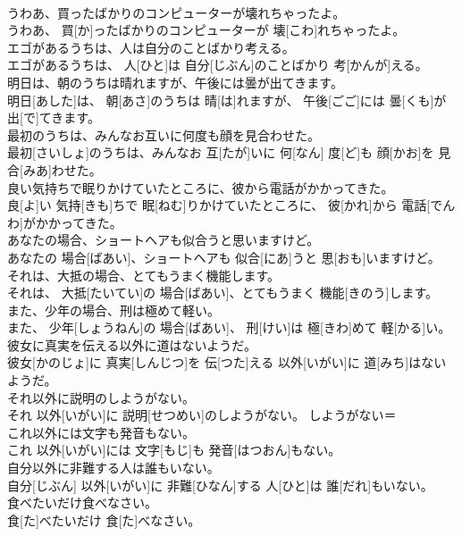 \documentclass[8pt]{extreport}
\begin{document}
\begin{CJK}{UTF8}{min}
\\	うわあ、買ったばかりのコンピューターが壊れちゃったよ。	
\\	うわあ、 買[か]ったばかりのコンピューターが 壊[こわ]れちゃったよ。	
\\	エゴがあるうちは、人は自分のことばかり考える。	
\\	エゴがあるうちは、 人[ひと]は 自分[じぶん]のことばかり 考[かんが]える。	
\\	明日は、朝のうちは晴れますが、午後には曇が出てきます。	
\\	明日[あした]は、 朝[あさ]のうちは 晴[は]れますが、 午後[ごご]には 曇[くも]が 出[で]てきます。	
\\	最初のうちは、みんなお互いに何度も顔を見合わせた。	
\\	最初[さいしょ]のうちは、みんなお 互[たが]いに 何[なん] 度[ど]も 顔[かお]を 見合[みあ]わせた。	
\\	良い気持ちで眠りかけていたところに、彼から電話がかかってきた。	
\\	良[よ]い 気持[きも]ちで 眠[ねむ]りかけていたところに、 彼[かれ]から 電話[でんわ]がかかってきた。	
\\	あなたの場合、ショートヘアも似合うと思いますけど。	
\\	あなたの 場合[ばあい]、ショートヘアも 似合[にあ]うと 思[おも]いますけど。	
\\	それは、大抵の場合、とてもうまく機能します。	
\\	それは、 大抵[たいてい]の 場合[ばあい]、とてもうまく 機能[きのう]します。	
\\	また、少年の場合、刑は極めて軽い。	
\\	また、 少年[しょうねん]の 場合[ばあい]、 刑[けい]は 極[きわ]めて 軽[かる]い。	
\\	彼女に真実を伝える以外に道はないようだ。	
\\	彼女[かのじょ]に 真実[しんじつ]を 伝[つた]える 以外[いがい]に 道[みち]はないようだ。	
\\	それ以外に説明のしようがない。	
\\	それ 以外[いがい]に 説明[せつめい]のしようがない。	しようがない＝ 
\\	これ以外には文字も発音もない。	
\\	これ 以外[いがい]には 文字[もじ]も 発音[はつおん]もない。	
\\	自分以外に非難する人は誰もいない。	
\\	自分[じぶん] 以外[いがい]に 非難[ひなん]する 人[ひと]は 誰[だれ]もいない。	
\\	食べたいだけ食べなさい。	
\\	食[た]べたいだけ 食[た]べなさい。	

\end{CJK}
\end{document}

